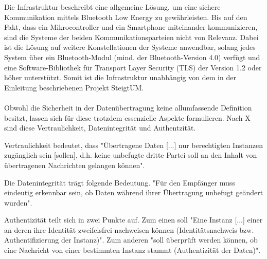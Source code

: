 Die Infrastruktur beschreibt eine allgemeine Lösung, um eine sichere Kommunikation mittels Bluetooth Low Energy zu gewährleisten. Bis auf den Fakt, dass ein Mikrocontroller und ein Smartphone miteinander kommunizieren, sind die Systeme der beiden Kommunikationsparteien nicht von Relevanz. Dabei ist die Lösung auf weitere Konstellationen der Systeme anwendbar, solang jedes System über ein Bluetooth-Modul (mind. der Bluetooth-Version 4.0) verfügt und eine Software-Bibliothek für Transport Layer Security (TLS) der Version 1.2 oder höher unterstützt. Somit ist die Infrastruktur unabhängig von dem in der Einleitung beschriebenen Projekt SteigtUM.
\\\\
Obwohl die Sicherheit in der Datenübertragung keine allumfassende Definition besitzt, lassen sich für diese trotzdem essenzielle Aspekte formulieren. Nach X 
sind diese Vertraulichkeit, Datenintegrität und Authentzität.

Vertraulichkeit bedeutet, dass "Übertragene Daten [...] nur berechtigten Instanzen zugänglich sein [sollen], d.h. keine unbefugte dritte Partei soll an den Inhalt von übertragenen Nachrichten gelangen können".

Die Datenintegrität trägt folgende Bedeutung. "Für den Empfänger muss eindeutig erkennbar sein, ob Daten während ihrer Übertragung unbefugt geändert wurden".

Authentizität teilt sich in zwei Punkte auf. Zum einen soll "Eine Instanz [...] einer an deren ihre Identität zweifelsfrei nachweisen können (Identitätsnachweis bzw. Authentifizierung der Instanz)". 
Zum anderen "soll überprüft werden können, ob eine Nachricht von einer bestimmten Instanz stammt (Authentizität der Daten)".
